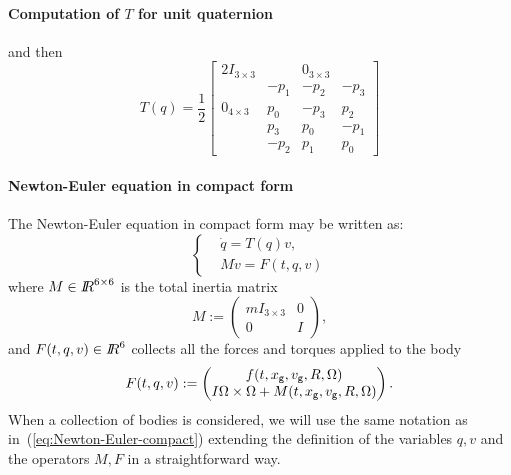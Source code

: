 \paragraph{Computation of $T$ for unit quaternion}


and then 
\begin{equation}
  T(q)=\frac 1 2 \label{eq:5}
  \begin{bmatrix}
    2 I_{3\times 3} & & 0_{3\times 3} & \\
    &   -p_1 & -p_2 & -p_3 \\
    0_{4\times 3}  &  p_0 & -p_3 & p_2 \\
    & p_3 & p_0 & -p_1 \\
    & -p_2 & p_1 & p_0 
  \end{bmatrix}
\end{equation}

\paragraph{Newton-Euler equation in compact form}

%
The Newton-Euler equation in compact form may be written as:
\begin{equation}
\label{eq:Newton-Euler-compact}
\boxed{ \left \{ 
 \begin{aligned}
  &\dot q=T(q)v, \\
  & M \dot v = F(t, q, v)
 \end{aligned}
 \right.}
\end{equation}
where $M\in\mbox{\rm $I\!\!R$}^{6\times6}$ is the total inertia matrix
\begin{equation}
  M:= \begin{pmatrix}
    m I_{3\times 3} & 0 \\
    0 & I 
  \end{pmatrix},
\end{equation}
and $F(t, q, v)\in \mbox{\rm $I\!\!R$}^6$ collects all the forces and torques applied to the body
\begin{equation}
  F(t,q,v):= \begin{pmatrix}
    f(t,x_{\sf \small g},  v_{\sf \small g}, R, \Omega ) \\
    I \Omega \times \Omega + M(t,x_{\sf \small g}, v_{\sf \small g}, R, \Omega )
  \end{pmatrix}.
\end{equation}
When a collection of bodies is considered, we will use the same notation as in~(\ref{eq:Newton-Euler-compact}) extending the definition of the variables $q,v$ and the operators $M,F$ in a straightforward way.

